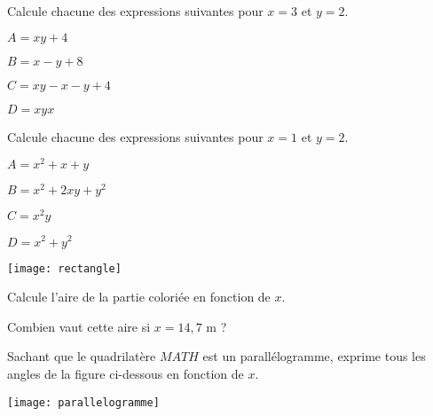 \begin{exercice}
Calcule chacune des expressions suivantes pour $x = 3$ et $y = 2$.
\begin{colenumerate}{2}
\item $A = xy + 4$
\item $B = x - y + 8$
\item $C = xy - x - y + 4$
\item $D = xyx$
\end{colenumerate}
\end{exercice}

\begin{exercice}
Calcule chacune des expressions suivantes pour $x = 1$ et $y = 2$.
\begin{colenumerate}{2}
\item $A = x^2 + x + y$
\item $B = x^2 + 2xy + y^2$
\item $C = x^2y$
\item $D = x^2 + y^2$
\end{colenumerate}
\end{exercice}










\begin{exercice}

\begin{center}
    \texttt{[image: rectangle]}
\end{center}

\begin{colenumerate}{1} 
\item Calcule l'aire de la partie coloriée en fonction de $x$.
\item Combien vaut cette aire si $x = 14,7$ m ?
\end{colenumerate} 
\end{exercice}

\begin{exercice}
Sachant que le quadrilatère $MATH$ est un parallélogramme, exprime tous les angles de la figure ci-dessous en fonction de $x$.

\begin{center}
    \texttt{[image: parallelogramme]}
\end{center}


\end{exercice}


